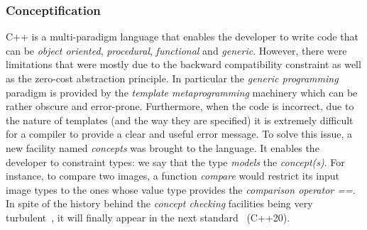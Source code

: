 \subsubsection{Conceptification}
\label{subsec:conceptification}

C++ is a multi-paradigm language that enables the developer to write code that can be \emph{object oriented},
\emph{procedural}, \emph{functional} and \emph{generic}. However, there were limitations that were mostly due to the
backward compatibility constraint as well as the zero-cost abstraction principle. In particular the \emph{generic
  programming} paradigm is provided by the \emph{template metaprogramming} machinery which can be rather obscure and
error-prone. Furthermore, when the code is incorrect, due to the nature of templates (and the way they are specified) it
is extremely difficult for a compiler to provide a clear and useful error message. To solve this issue, a new facility
named \emph{concepts} was brought to the language. It enables the developer to constraint types: we say that the type
\emph{models} the \emph{concept(s)}. For instance, to compare two images, a function \emph{compare} would restrict its
input image types to the ones whose value type provides the \emph{comparison operator ==}. In spite of the history
behind the \emph{concept checking} facilities being very
turbulent~\parencite{seymour.2009.concepts,stroustrup.2003.concepts,sutton.2017.concepts}, it will finally appear in the
next standard~\cite{voutilainen.2017.concepts} (C++20).

